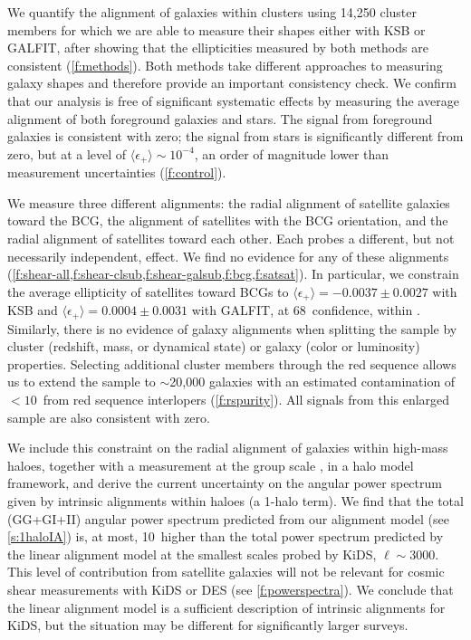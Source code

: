 We quantify the alignment of galaxies within clusters using 14,250 cluster members for which 
we are able to measure their shapes either with KSB or GALFIT, after showing that the ellipticities 
measured by both methods are consistent (\cref{f:methods}). Both methods take different approaches 
to measuring galaxy shapes and therefore provide an important consistency check. We confirm that our 
analysis is free of significant systematic effects by measuring the average alignment of both 
foreground galaxies and stars. The signal from foreground galaxies is consistent with zero; the 
signal from stars is significantly different from zero, but at a level of 
$\langle\epsilon_+\rangle\sim10^{-4}$, an order of magnitude lower than measurement uncertainties 
(\cref{f:control}).

We measure three different alignments: the radial alignment of satellite galaxies toward the BCG, 
the alignment of satellites with the BCG orientation, and the radial alignment of satellites toward 
each other. Each probes a different, but not necessarily independent, effect. We find no evidence 
for any of these alignments (\cref{f:shear-all,f:shear-clsub,f:shear-galsub,f:bcg,f:satsat}). In 
particular, we constrain the average ellipticity of satellites toward BCGs to 
$\langle\epsilon_+\rangle=-0.0037\pm0.0027$ with KSB and 
$\langle\epsilon_+\rangle=0.0004\pm0.0031$ with GALFIT, at 68\percent\ confidence, within \radius. 
Similarly, there is no evidence of galaxy alignments when splitting the sample by cluster (redshift, 
mass, or dynamical state) or galaxy (color or luminosity) properties. Selecting additional cluster 
members through the red sequence allows us to extend the sample to $\sim$20,000 galaxies with an 
estimated contamination of $<10$\percent\ from red sequence interlopers (\cref{f:rspurity}). All signals 
from this enlarged sample are also consistent with zero.

We include this constraint on the radial alignment of galaxies within high-mass haloes, together 
with a measurement at the group scale \citep{schneider13}, in a halo model framework, and derive 
the current uncertainty on the angular power spectrum given by intrinsic alignments within haloes (a 
1-halo term). We find that the total (GG+GI+II) angular power spectrum predicted from our alignment 
model (see \cref{s:1haloIA}) is, at most, 10\percent\ higher than the total power spectrum predicted by the 
linear alignment model at the smallest scales probed by KiDS, $\ell\sim3000$. This level of 
contribution from satellite galaxies will not be relevant for cosmic shear measurements with KiDS or 
DES (see \cref{f:powerspectra}). We conclude that the linear alignment model is a sufficient 
description of intrinsic alignments for KiDS, but the situation may be different for significantly 
larger surveys.



